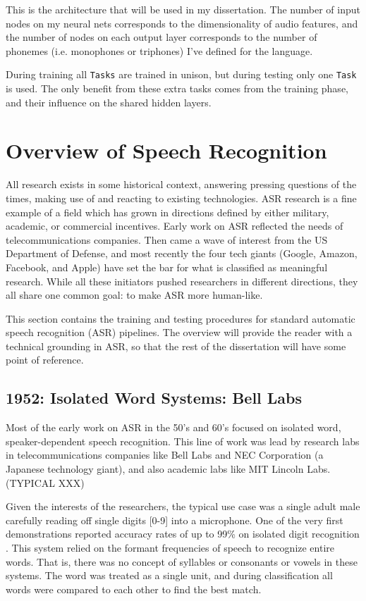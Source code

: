 \documentclass[10pt,a4paper]{article}
\begin{document}
This is the architecture that will be used in my dissertation. The number of input nodes on my neural nets corresponds to the dimensionality of audio features, and the number of nodes on each output layer corresponds to the number of phonemes (i.e. monophones or triphones) I've defined for the language.

During training all \texttt{Tasks} are trained in unison, but during testing only one \texttt{Task} is used. The only benefit from these extra tasks comes from the training phase, and their influence on the shared hidden layers.






\newpage

\section{Overview of Speech Recognition}

All research exists in some historical context, answering pressing questions of the times, making use of and reacting to existing technologies. ASR research is a fine example of a field which has grown in directions defined by either military, academic, or commercial incentives. Early work on ASR reflected the needs of telecommunications companies. Then came a wave of interest from the US Department of Defense, and most recently the four tech giants (Google, Amazon, Facebook, and Apple) have set the bar for what is classified as meaningful research. While all these initiators pushed researchers in different directions, they all share one common goal: to make ASR more human-like.

This section contains the training and testing procedures for standard automatic speech recognition (ASR) pipelines. The overview will provide the reader with a technical grounding in ASR, so that the rest of the dissertation will have some point of reference. 

\subsection{1952: Isolated Word Systems: Bell Labs}
Most of the early work on ASR in the 50's and 60's focused on isolated word, speaker-dependent speech recognition. This line of work was lead by research labs in telecommunications companies like Bell Labs and NEC Corporation (a Japanese technology giant), and also academic labs like MIT Lincoln Labs. (TYPICAL XXX)

Given the interests of the researchers, the typical use case was a single adult male carefully reading off single digits [0-9] into a microphone. One of the very first demonstrations reported accuracy rates of up to 99\% on isolated digit recognition \cite{davis1952automatic}. This system relied on the formant frequencies of speech to recognize entire words. That is, there was no concept of syllables or consonants or vowels in these systems. The word was treated as a single unit, and during classification all words were compared to each other to find the best match.
\end{document}
